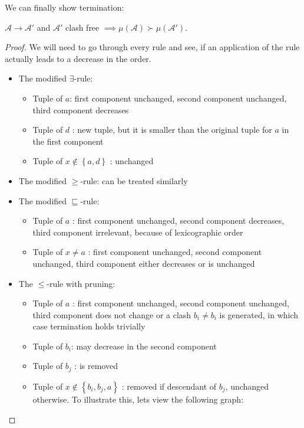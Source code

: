We can finally show termination:
\begin{lemma}\label{lem:implication_multiset_order}
	$\mathcal{A} \to \mathcal{A}'$ and $\mathcal{A}'$ clash free $ \implies \mu(\mathcal{A}) \succ \mu(\mathcal{A}')$.
\end{lemma}
\begin{proof}
	We will need to go through every rule and see, if an application of the rule actually leads to a  decrease in the order. 
	\begin{itemize}
		\item The modified $\exists$-rule:
			\begin{itemize}
				\item Tuple of $a$: first component unchanged,
					second component unchanged,
					third component decreases
				\item Tuple of $d$ : new tuple, but it is smaller than the original tuple for $a$ in the first component
				\item Tuple of $x \notin \left\{ a,d \right\}$ : unchanged
			\end{itemize}
		\item The modified $ \geq$-rule: can be treated similarly
		\item The modified $\sqsubseteq$-rule:
			\begin{itemize}
				\item Tuple of $a$ : first component unchanged,
					second component decreases,
					third component irrelevant, because of lexicographic order
				\item Tuple of $x \neq a$ : first component unchanged,
					second component unchanged,
					third component either decreases or is unchanged
			\end{itemize}
		\item The $ \leq$-rule with pruning:
			\begin{itemize}
				\item Tuple of $a$ : first component unchanged,
					second component unchanged,
					third component does not change or a clash $b_i \neq b_i$ is generated,
					in which case termination holds trivially
				\item Tuple of $b_i$: may decrease in the second component
				\item Tuple of $b_j$ : is removed
				\item Tuple of $x \notin \left\{ b_i, b_j, a \right\}$ :
					removed if descendant of $b_j$,
					unchanged otherwise.
					To illustrate this, lets view the following graph:
					\begin{figure}[H]

\end{figure}
\end{itemize}
\end{itemize}
\end{proof}
